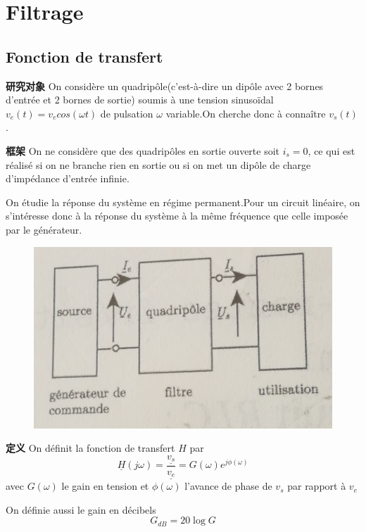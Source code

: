 \documentclass[12pt]{book}
\theoremstyle{definition}\newtheorem{dfn}{Définition}[chapter]
\theoremstyle{plain}\newtheorem{thm}{Théorème}[chapter]
\theoremstyle{plain}\newtheorem{prp}{Proposition}[chapter]
\theoremstyle{plain}\newtheorem{lem}{\bf Lemme}[chapter]
\theoremstyle{plain}\newtheorem{axm}{\bf Axiome}[chapter]
\theoremstyle{plain}\newtheorem{lmm}{\bf Lemme}[chapter]
\theoremstyle{plain}\newtheorem{cor}{\bf Corollaire}[chapter]
\theoremstyle{remark}\newtheorem{rem}{Remarque}[chapter]
\begin{document}
\chapter{Filtrage}
\section{Fonction de transfert}
\begin{framed}{\textbf{研究对象}}
On considère un quadripôle(c'est-à-dire un dipôle avec 2 bornes d'entrée et 2 bornes de sortie) soumis à une tension sinusoïdal $v_e(t)=v_e cos(\omega t)$ de pulsation $\omega$ variable.On cherche donc à connaître $v_s(t)$.
\end{framed}

\begin{framed}{\textbf{框架}}
	On ne considère que des quadripôles en sortie ouverte soit $i_s=0$, ce qui est réalisé si on ne branche rien en sortie ou si on met un dipôle de charge d'impédance d'entrée infinie.
	
	On étudie la réponse du système en régime permanent.Pour un circuit linéaire, on s'intéresse donc à la réponse du système à la même fréquence que celle imposée par le générateur.
\end{framed}

\begin{figure}[H]
	\centering
	\includegraphics[scale=0.08]{image//Filtrage//1}
\end{figure}


\begin{framed}{\textbf{定义}}
On définit la fonction de transfert $H$ par 
$$
\underline{H}(j\omega)=\frac{\underline{v_s}}{\underline{v_e}}=G(\omega)e^{j\phi(\omega)}
$$ 	
avec $G(\omega)$ le gain en tension et $\phi(\omega)$ l'avance de phase de $v_s$ par rapport à $v_e$

On définie aussi {\color{red}le gain en décibels}
$$
G_{dB}=20\log G
$$	
\end{framed}
\end{document}
